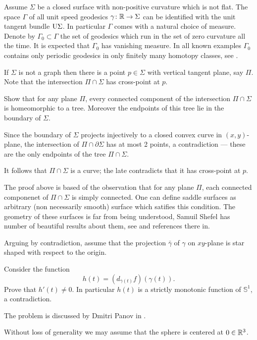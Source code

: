 Assume $\Sigma$ be a closed surface with non-positive curvature which is not flat.
The space $\Gamma$ of all unit speed geodesics $\gamma\colon\mathbb{R}\to\Sigma$ can be identified with the unit tangent bundle $\mathrm{U}\Sigma$. 
In particular $\Gamma$ comes with a natural choice of measure.
Denote by $\Gamma_0\subset \Gamma$ the set of geodesics which run in the set of zero curvature all the time.
It is expected that $\Gamma_0$ has vanishing measure.
In all known examples $\Gamma_0$ contains only periodic geodesics in only finitely many homotopy classes, see \cite{hertz}.

If $\Sigma$ is not a graph then there is a point $p\in\Sigma$ with vertical tangent plane, say $\Pi$.
Note that the intersection $\Pi\cap\Sigma$ has cross-point at $p$.

Show that for any plane $\Pi$,
every connected component of the intersection $\Pi\cap\Sigma$ is homeomorphic to a tree.
Moreover the endpoints of this tree lie in the boundary of $\Sigma$.

Since the boundary of $\Sigma$ projects injectively to a closed convex curve in $(x,y)$-plane,
the intersection of $\Pi\cap\partial \Sigma$ has at most 2 points,
a contradiction --- these are the only endpoints of the tree $\Pi\cap\Sigma$.

It follows that $\Pi\cap\Sigma$ is a curve; the late contradicts that it has cross-point at $p$.\qeds

The proof above is based of the observation 
that for any plane $\Pi$,
each connected componenet of $\Pi\cap\Sigma$ is simply connected.
One can define saddle surfaces as arbitrary (non necessarily smooth) surface which satifies this condition.
The geometry of these surfaces is far from being understood,
Samuil Shefel has number of beautiful results about them, 
see \cite{shefel} and references there in.


Arguing by contradiction, assume that the projection $\bar\gamma$
of $\gamma$ on $x y$-plane is star shaped with respect to the origin.

Consider the function 
$$h(t)=(d_{\bar\gamma(t)}f)(\gamma(t)).$$
Prove that $h'(t)\ne 0$.
In particular $h(t)$ is a strictly monotonic function of $\mathbb{S}^1$, a contradiction.\qeds

The problem is discussed by Dmitri Panov in \cite{panov-curves}.

Without loss of generality we may assume that the sphere is centered at $0\in\mathbb{R}^3$.

